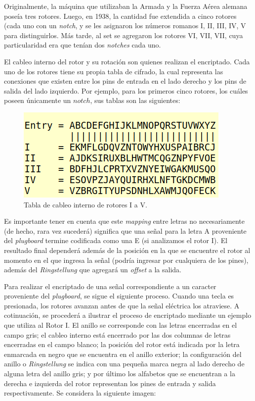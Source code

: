 \documentclass[a4paper,10pt]{article}
\begin{document}
Originalmente, la máquina que utilizaban la Armada y la Fuerza Aérea alemana poseía tres rotores. Luego, en 1938, la cantidad fue extendida a cinco rotores (cada uno con un \textit{notch}, y se les asignaron los números romanos I, II, III, IV, V para distinguirlos. Más tarde, al set se agregaron los rotores VI, VII, VII, cuya particularidad era que tenían dos \textit{notches} cada uno. 

El cableo interno del rotor y su rotación son quienes realizan el encriptado. Cada uno de los rotores tiene su propia tabla de cifrado, la cual representa las conexiones que existen entre los pins de entrada en el lado derecho y los pins de salida del lado izquierdo. Por ejemplo, para los primeros cinco rotores, los cuáles poseen únicamente un $notch$, sus tablas son las siguientes:

\begin{figure}[H]
    \centering
    \includegraphics[scale=0.38]{tabla-rotor.png}
    \caption{Tabla de cableo interno de rotores I a V.\cite{rijmenants}}
    \label{fig:my_label}
\end{figure}

Es importante tener en cuenta que este \textit{mapping} entre letras no necesariamente (de hecho, rara vez sucederá) significa que una señal para la letra A proveniente del \textit{plugboard} termine codificada como una E (si analizamos el rotor I). El resultado final dependerá además de la posición en la que se encuentre el rotor al momento en el que ingresa la señal (podría ingresar por cualquiera de los pines), además del \textit{Ringstellung} que agregará un \textit{offset} a la salida.

Para realizar el encriptado de una señal correspondiente a un caracter proveniente del \textit{plugboard}, se sigue el siguiente proceso. Cuando una tecla es presionada, los rotores avanzan antes de que la señal eléctrica los atraviese. A cotinuación, se procederá a ilustrar el proceso de encriptado mediante un ejemplo que utiliza al Rotor I. El anillo se corresponde con las letras encerradas en el campo gris; el cableo interno está encerrado por las dos columnas de letras encerradas en el campo blanco; la posición del rotor está indicada por la letra enmarcada en negro que se encuentra en el anillo exterior; la configuración del anillo o \textit{Ringstellung} se indica con una pequeña marca negra al lado derecho de alguna letra del anillo gris; y por último los alfabetos que se encuentran a la derecha e izquierda del rotor representan los pines de entrada y salida respectivamente. Se considera la siguiente imagen:
\end{document}
